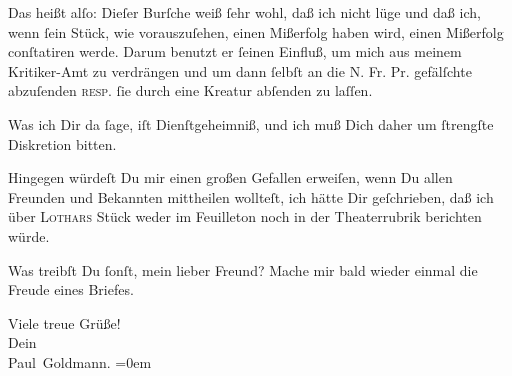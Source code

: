 \pstart
           {\pb}Das heißt alſo: Dieſer Burſche weiß ſehr wohl, daß ich nicht lüge
               und daß ich, wenn ſein Stück,
               wie vorauszuſehen, einen Mißerfolg haben wird, einen Mißerfolg conſtatiren werde.
               Darum benutzt er ſeinen Einfluß, um mich aus meinem Kritiker-Amt zu verdrängen und um
                  \introOben{}dann\introOben{} ſelbſt an die N. Fr.
                  Pr. gefälſchte \label{K_L02915-2v}\label{K_L02915-2} abzuſenden \textsc{resp.} ſie durch eine Kreatur abſenden zu
               laſſen.\pend
           
\pstart
           Was \strikeout{\textcolor{gray}{×}} ich Dir da ſage, iſt Dienſtgeheimniß, und ich muß Dich daher um ſtrengſte
               Diskretion bitten.\pend
           
\pstart
           {\pb}Hingegen würdeſt Du mir einen großen Gefallen
               erweiſen, wenn Du allen Freunden und Bekannten mittheilen wollteſt, ich hätte Dir
               geſchrieben, daß ich über \textsc{Lothars}{ }Stück weder im Feuilleton noch in der Theaterrubrik berichten würde.\pend
           
\pstart
           Was treibſt Du ſonſt, mein lieber Freund? Mache mir bald wieder einmal die Freude
               eines Briefes.\pend
           
\pstart
           Viele treue Grüße! {\\[\baselineskip]}Dein {\\[\baselineskip]}\spacefill\mbox{Paul Goldmann.}\pend
           \leftskip=0em{}\endnumbering{}  
      